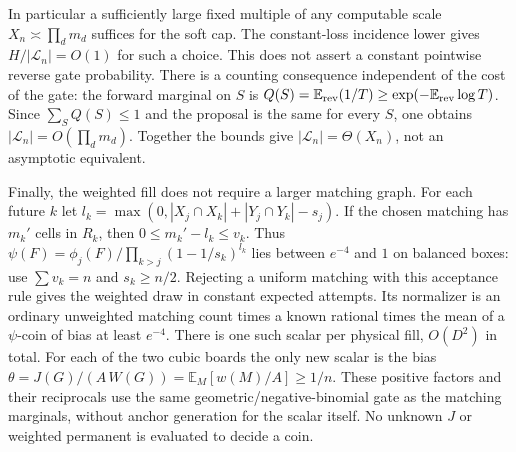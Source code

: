 In particular a sufficiently large fixed multiple of any computable
scale $X_n\asymp\prod_d m_d$ suffices for the soft cap. The
constant-loss incidence lower gives $H/|\mathcal L_n|=O(1)$ for such
a choice. This does not assert a constant pointwise reverse gate
probability. There is a counting consequence independent of the cost
of the gate: the forward marginal on $S$ is
$Q(S)=\mathbb E_{\rm rev}(1/T)\ge\exp(-\mathbb E_{\rm rev}\log T)$.
Since $\sum_S Q(S)\le1$ and the proposal is the same for every $S$,
one obtains $|\mathcal L_n|=O(\prod_d m_d)$. Together the bounds give
$|\mathcal L_n|=\Theta(X_n)$, not an asymptotic equivalent.

Finally, the weighted fill does not require a larger matching graph.
For each future $k$ let $l_k=\max(0,|X_j\cap X_k|+|Y_j\cap Y_k|-s_j)$.
If the chosen matching has $m_k'$ cells in $R_k$, then
$0\le m_k'-l_k\le v_k$. Thus
$\psi(F)=\phi_j(F)/\prod_{k>j}(1-1/s_k)^{l_k}$ lies between $e^{-4}$
and $1$ on balanced boxes: use $\sum v_k=n$ and $s_k\ge n/2$.
Rejecting a uniform matching with this acceptance rule gives the
weighted draw in constant expected attempts. Its normalizer is an
ordinary unweighted matching count times a known rational times the
mean of a $\psi$-coin of bias at least $e^{-4}$. There is one such
scalar per physical fill, $O(D^2)$ in total. For each of the two cubic
boards the only new scalar is the bias
$\theta=J(G)/(A\,W(G))=\mathbb E_M[w(M)/A]\ge1/n$.
These positive factors and their reciprocals use the same
geometric/negative-binomial gate as the matching marginals, without
anchor generation for the scalar itself. No unknown $J$ or weighted
permanent is evaluated to decide a coin.
